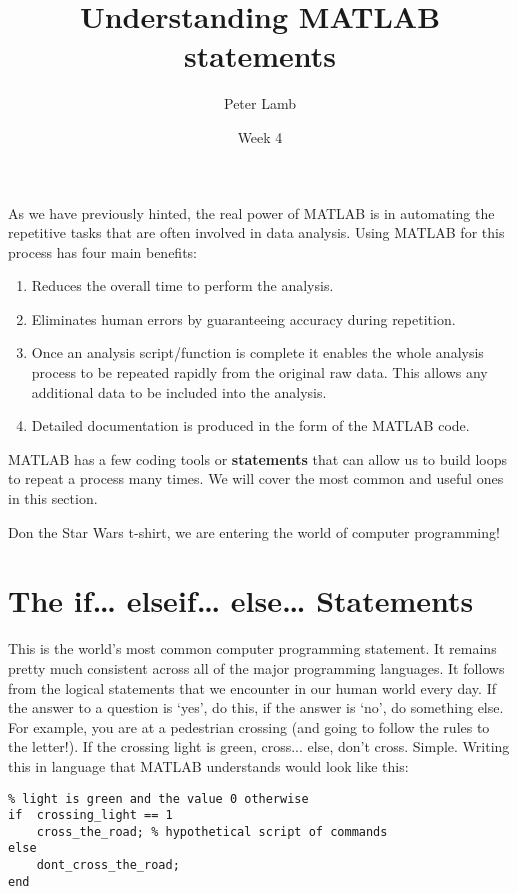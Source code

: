 \documentclass[12pt,a4paper]{article}
\title{Understanding MATLAB statements}
\author{Peter Lamb}
\date{Week 4}
\begin{document}
\maketitle

As we have previously hinted, the real power of MATLAB is in automating the repetitive tasks that are often involved in data analysis.  
Using MATLAB for this process has four main benefits:
\begin{enumerate}
	\item Reduces the overall time to perform the analysis.
	\item Eliminates human errors by guaranteeing accuracy during repetition.
	\item Once an analysis script/function is complete it enables the whole analysis process to be repeated rapidly from the original raw data.  This allows any additional data to be included into the analysis.
	\item Detailed documentation is produced in the form of the MATLAB code.
\end{enumerate}

MATLAB has a few coding tools or \textbf{statements} that can allow us to build loops to repeat a process many times.  We will cover the most common and useful ones in this section.

Don the Star Wars t-shirt, we are entering the world of computer programming!

\section{The if\dots{} elseif\dots{} else\dots{} Statements}
This is the world's most common computer programming statement.  
It remains pretty much consistent across all of the major programming languages.  It follows from the logical statements that we encounter in our human world every day.  
If the answer to a question is `yes', do this, if the answer is `no', do something else.  
For example, you are at a pedestrian crossing (and going to follow the rules to the letter!).  
If the crossing light is green, cross... else, don't cross.  
Simple.  
Writing this in language that MATLAB understands would look like this:

\begin{lstlisting}[style=Matlab-editor]
% crossing_light has the value 1 when the crossing 
% light is green and the value 0 otherwise
if  crossing_light == 1
    cross_the_road; % hypothetical script of commands
else
    dont_cross_the_road;
end
\end{lstlisting}
\end{document}
